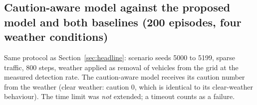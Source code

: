\subsection{Caution-aware model against the proposed model and both baselines (200 episodes, four weather conditions)}\label{sec:cautioncompare}
Same protocol as Section~\ref{sec:headline}: scenario seeds 5000 to 5199, sparse traffic, 800 steps, weather applied as removal of vehicles from the grid at the measured detection rate. The caution-aware model receives its caution number from the weather (clear weather: caution 0, which is identical to its clear-weather behaviour). The time limit was \emph{not} extended; a timeout counts as a failure.
\begin{table}[H]\centering\scriptsize
\caption{Every metric for every model and weather condition, 200 episodes each. Collision, left road and timeout are shares of episodes; the success rate is one minus their sum. Energy is an estimate for a declared virtual vehicle without regenerative braking.}\label{tab:cautioncompare}
\resizebox{\textwidth}{!}{}
\end{table}

\begin{table}[H]\centering\scriptsize
\caption{Paired comparison of the caution-aware model with each other model on the same 200 episodes. Positive differences favour the caution-aware model.}\label{tab:cautionpaired}
\resizebox{\textwidth}{!}{}
\end{table}
